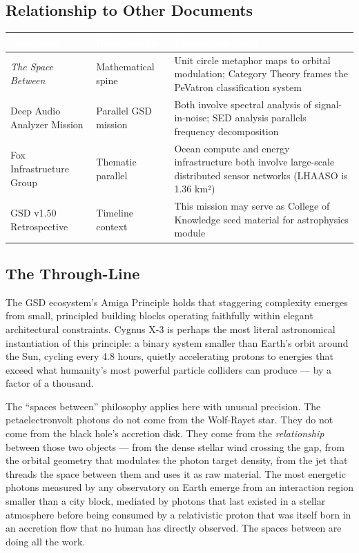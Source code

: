 \documentclass[11pt,letterpaper]{article}
\newcommand{\tableheader}[1]{\textbf{\sffamily\textcolor{white}{#1}}}
\begin{document}
\subsection{Relationship to Other Documents}

\begin{center}
\begin{tabularx}{\textwidth}{L{4cm}L{4cm}X}
\toprule
{}
\tableheader{Document} & \tableheader{Relationship} & \tableheader{Connection Point} \\
\midrule
\emph{The Space Between} & Mathematical spine & Unit circle metaphor maps to orbital modulation; Category Theory frames the PeVatron classification system \\
Deep Audio Analyzer Mission & Parallel GSD mission & Both involve spectral analysis of signal-in-noise; SED analysis parallels frequency decomposition \\
Fox Infrastructure Group & Thematic parallel & Ocean compute and energy infrastructure both involve large-scale distributed sensor networks (LHAASO is 1.36 km²) \\
GSD v1.50 Retrospective & Timeline context & This mission may serve as College of Knowledge seed material for astrophysics module \\
\bottomrule
\end{tabularx}
\end{center}

\subsection{The Through-Line}

The GSD ecosystem's Amiga Principle holds that staggering complexity emerges from small, principled building blocks operating faithfully within elegant architectural constraints. Cygnus X-3 is perhaps the most literal astronomical instantiation of this principle: a binary system smaller than Earth's orbit around the Sun, cycling every 4.8 hours, quietly accelerating protons to energies that exceed what humanity's most powerful particle colliders can produce --- by a factor of a thousand.

The ``spaces between'' philosophy applies here with unusual precision. The petaelectronvolt photons do not come from the Wolf-Rayet star. They do not come from the black hole's accretion disk. They come from the \emph{relationship} between those two objects --- from the dense stellar wind crossing the gap, from the orbital geometry that modulates the photon target density, from the jet that threads the space between them and uses it as raw material. The most energetic photons measured by any observatory on Earth emerge from an interaction region smaller than a city block, mediated by photons that last existed in a stellar atmosphere before being consumed by a relativistic proton that was itself born in an accretion flow that no human has directly observed. The spaces between are doing all the work.
\end{document}
